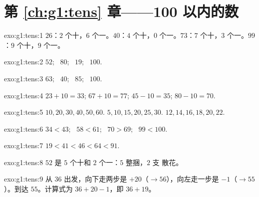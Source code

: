 \section*{第 \ref{ch:g1:tens} 章——100 以内的数}

\begin{solution}{exo:g1:tens:1}
$26$：$2$ 个十，$6$ 个一。$40$：$4$ 个十，$0$ 个一。$73$：$7$
个十，$3$ 个一。$99$：$9$ 个十，$9$ 个一。
\end{solution}

\begin{solution}{exo:g1:tens:2}
$52$; \ $80$; \ $19$; \ $100$.
\end{solution}

\begin{solution}{exo:g1:tens:3}
$63$; \ $40$; \ $85$; \ $100$.
\end{solution}

\begin{solution}{exo:g1:tens:4}
$23 + 10 = 33$; \quad $67 + 10 = 77$; \quad $45 - 10 = 35$; \quad
$80 - 10 = 70$.
\end{solution}

\begin{solution}{exo:g1:tens:5}
$10, 20, 30, 40, 50, 60$. \quad $5, 10, 15, 20, 25, 30$. \quad
$12, 14, 16, 18, 20, 22$.
\end{solution}

\begin{solution}{exo:g1:tens:6}
$34 < 43$; \ $58 < 61$; \ $70 > 69$; \ $99 < 100$.
\end{solution}

\begin{solution}{exo:g1:tens:7}
$19 < 41 < 46 < 64 < 91$.
\end{solution}

\begin{solution}{exo:g1:tens:8}
$52$ 是 $5$ 个十和 $2$ 个一：$5$ 整捆，$2$ 支
散花。
\end{solution}

\begin{solution}{exo:g1:tens:9}
从 $36$ 出发，向下走两步是 $+20$（$\to 56$），向左走一步是
$-1$（$\to 55$）。到达 $55$。计算式为
$36 + 20 - 1$，即 $36 + 19$。
\end{solution}
